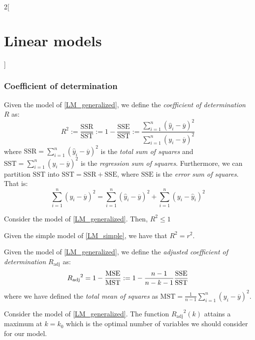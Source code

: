 \documentclass[../../../main_math.tex]{subfiles}
\begin{document}
\begin{multicols}{2}[\section{Linear models}]
  \subsubsection{Coefficient of determination}
  \begin{definition}
    Given the model of \cref{LM_generalized}, we define the \emph{coefficient of determination} $R$ as:
    $$R^2:=\frac{\mathrm{SSR}}{\mathrm{SST}}:=1-\frac{\mathrm{SSE}}{\mathrm{SST}}:=\frac{\sum_{i=1}^n{(\hat{y}_i-\overline{y})}^2}{\sum_{i=1}^n{(y_i-\overline{y})}^2}$$ where $\mathrm{SSR}=\sum_{i=1}^n{(\hat{y}_i-\overline{y})}^2$ is the \emph{total sum of squares} and $\mathrm{SST}=\sum_{i=1}^n{(y_i-\overline{y})}^2$ is the \emph{regression sum of squares}. Furthermore, we can partition $\mathrm{SST}$ into $\mathrm{SST}=\mathrm{SSR}+\mathrm{SSE}$, where $\mathrm{SSE}$ is the \emph{error sum of squares}. That is: $$\sum_{i=1}^n{(y_i-\overline{y})}^2=\sum_{i=1}^n{(\hat{y}_i-\overline{y})}^2+\sum_{i=1}^n{(y_i-\hat{y}_i)}^2$$
  \end{definition}
  \begin{lemma}
    Consider the model of \cref{LM_generalized}. Then, $R^2\leq 1$
  \end{lemma}
  \begin{proposition}
    Given the simple model of \cref{LM_simple}, we have that $R^2=r^2$.
  \end{proposition}
  \begin{definition}
    Given the model of \cref{LM_generalized}, we define the \emph{adjusted coefficient of determination} $R_{\mathrm{adj}}$ as: $${R_{\mathrm{adj}}}^2=1-\frac{\operatorname{MSE}}{\mathrm{MST}}:=1-\frac{n-1}{n-k-1}\frac{\mathrm{SSE}}{\mathrm{SST}}$$ where we have defined the \emph{total mean of squares} as $\mathrm{MST}=\frac{1}{n-1}\sum_{i=1}^n{(y_i-\overline{y})}^2$.
  \end{definition}
  \begin{lemma}
    Consider the model of \cref{LM_generalized}. The function ${R_{\mathrm{adj}}}^2(k)$ attains a maximum at $k=k_0$ which is the optimal number of variables we should consider for our model.
  \end{lemma}

\end{multicols}
\end{document}
